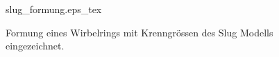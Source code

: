\begin{figure}
\centering
\def\svgwidth{0.9\columnwidth}
{slug_formung.eps_tex}
\caption{Formung eines Wirbelrings mit Krenngrössen des Slug Modells eingezeichnet. \label{buch:papers:Wirbelringe:fig:slug_formung}}
\end{figure}